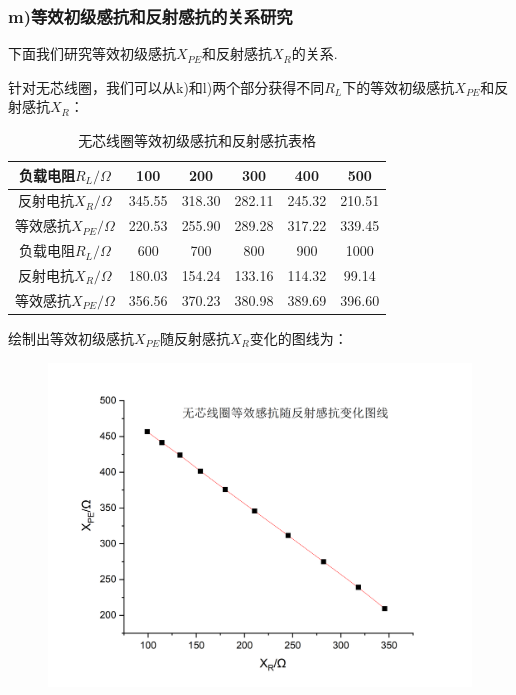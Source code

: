 \documentclass[UTF8]{ctexart}
\begin{document}
\subsubsection*{m)等效初级感抗和反射感抗的关系研究}
下面我们研究等效初级感抗$X_{PE}$和反射感抗$X_R$的关系.\par
针对无芯线圈，我们可以从k)和l)两个部分获得不同$R_L$下的等效初级感抗$X_{PE}$和反射感抗$X_R$：
\begin{table}[H]\begin{center}
        \caption{无芯线圈等效初级感抗和反射感抗表格}
        \begin{tabular}{|c|c|c|c|c|c|}
            \hline
            负载电阻$R_L/\Omega$&100&200&300&400&500\\ 
            \hline
            反射电抗$X_R/\Omega$&345.55&318.30&282.11&245.32&210.51\\
            \hline
            等效感抗$X_{PE}/\Omega$&220.53&255.90&289.28&317.22&339.45\\
            \hline
            \hline
            负载电阻$R_L/\Omega$&600&700&800&900&1000\\
            \hline
            反射电抗$X_R/\Omega$&180.03&154.24&133.16&114.32&99.14\\
            \hline
            等效感抗$X_{PE}/\Omega$&356.56&370.23&380.98&389.69&396.60\\
            \hline
        \end{tabular}
    \restoregeometry
\end{center}\end{table}
绘制出等效初级感抗$X_{PE}$随反射感抗$X_R$变化的图线为：
\begin{figure}[H]\begin{center}
    \includegraphics*[scale = 0.5]{graph1.png}
\end{center}\end{figure}
\end{document}
